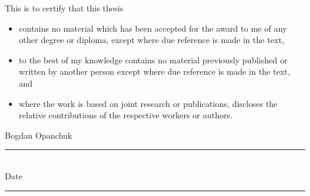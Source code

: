 
\cleardoublepage





\cleardoublepage


This is to certify that this thesis

\begin{itemize}
\item[\hfleuron] contains no material which has been accepted for the award to me of any other degree or diploma, except where due reference is made in the text,
\item[\hfleuron] to the best of my knowledge contains no material previously published or written by another person except where due reference is made in the text, and
\item[\hfleuron] where the work is based on joint research or publications, discloses the relative contributions of the respective workers or authors.
\end{itemize}

\vspace{2cm}

\begin{flushright}
Bogdan Opanchuk \hspace{0.5cm} \rule{4cm}{1pt} \\
\vspace{1cm}
Date \hspace{0.5cm} \rule{4cm}{1pt}
\end{flushright}

